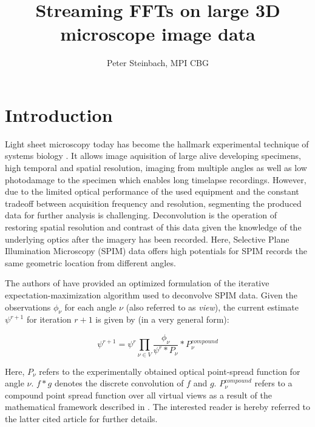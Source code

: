 \documentclass [12pt]{article}
\title{Streaming FFTs on large 3D microscope image data}
\author{Peter Steinbach, MPI CBG}
\begin{document}
\maketitle
\begin{abstract}

\end{abstract}

\section{Introduction}

Light sheet microscopy today has become the hallmark experimental technique of systems biology \cite{Huisken13082004, Keller14112008}. It allows image aquisition of large alive developing specimens, high temporal and spatial resolution, imaging from multiple angles as well as low photodamage to the specimen which enables long timelapse recordings. However, due to the limited optical performance of the used equipment and the constant tradeoff between acquisition frequency and resolution, segmenting the produced data for further analysis is challenging. Deconvolution is the operation of restoring spatial resolution and contrast of this data given the knowledge of the underlying optics after the imagery has been recorded. Here, Selective Plane Illumination Microscopy (SPIM) data offers high potentials for SPIM records the same geometric location from different angles.\newline

The authors of \cite{2013arXiv1308.0730P} have provided an optimized formulation of the iterative expectation-maximization algorithm used to deconvolve SPIM data. Given the observations $\phi_\nu$ for each angle $\nu$ (also referred to as \textit{view}), the current estimate $\psi^{r+1}$ for iteration $r+1$ is given by (in a very general form):

\begin{equation}
\psi^{r+1} = \psi^{r} \prod_{\nu \in V} \frac{\phi_{\nu}}{\psi^{r} \ast P_{\nu} } \ast P^{compound}_{\nu}
\end{equation}

Here, $P_{\nu}$ refers to the experimentally obtained optical point-spread function for angle $\nu$. $f \ast g$ denotes the discrete convolution of $f$ and $g$. $P^{compound}_{\nu}$ refers to a compound point spread function over all virtual views as a result of the mathematical framework described in \cite{2013arXiv1308.0730P}. The interested reader is hereby referred to the latter cited article for further details.\newline
\end{document}

